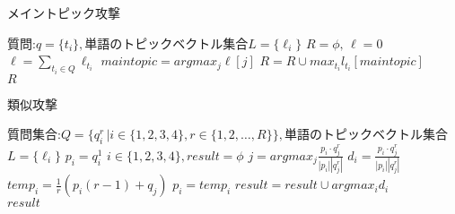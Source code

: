 \documentclass{jsarticle}
\theoremstyle{definition}
\begin{document}
\begin{algorithm}
\caption{メイントピック攻撃}
\begin{algorithmic}[1]
    \Require 質問:$q=\{t_i\},$単語のトピックベクトル集合$L=\{\ell_i\}$
    \State $R=\phi, \, \ell=0$
    \State $\ell=\sum_{t_i \in Q}\ell_{t_i}$
    \State $maintopic=argmax_j \ell[j]$
    \State $R=R \cup max_{t_i}l_{t_i}[maintopic]$
    \EndFor　\\
    \Return $R$
\end{algorithmic}
\end{algorithm}

\begin{algorithm}
\caption{類似攻撃}
\begin{algorithmic}[1]
    \Require 質問集合:$Q=\{q^r_i\, | i \in \{1,2,3,4\},r \in \{1,2, \dots ,R\}\},$単語のトピックベクトル集合$L=\{\ell_i\}$
    \State $p_i= q^1_i \, \, i \in \{1,2,3,4\} , result = \phi $
		\State $j = argmax_j \frac{p_i \cdot q^r_j}{|p_i||q^r_j|}$
		\State $d_i = \frac{p_i \cdot q^r_j}{|p_i||q^r_j|}$
		\State $temp_i = \frac{1}{r}(p_i(r-1) + q_j)$
		\EndFor
		\State $p_i = temp_i $
		\EndFor
    \State $result =result \cup argmax_{i}d_i$
    \EndFor　\\
    \Return $result$
\end{algorithmic}
\end{algorithm}
\end{document}
